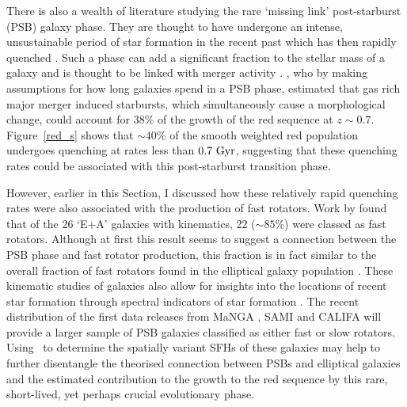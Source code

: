 There is also a wealth of literature studying the rare \citep[$<1\%$;][]{Wong12, wild16} `missing link' post-starburst (PSB) galaxy phase. They are thought to have undergone an intense, unsustainable period of star formation in the recent past which has then rapidly quenched \citep{dressler83, abraham96b, poggianti99, goto03, goto05b, goto07}. Such a phase can add a significant fraction \citep[$\sim10\%$;][]{wild10} to the stellar mass of a galaxy and is thought to be linked with merger activity \citep{zabludoff96, blake04, goto05b, yang08, pawlik16}. \citet{Wild09}, who by making assumptions for how long galaxies spend in a PSB phase, estimated that gas rich major merger induced starbursts, which simultaneously cause a morphological change, could account for $38\%$ of the growth of the red sequence at $z\sim0.7$. Figure~\ref{red_s} shows that $\sim40\%$ of the smooth weighted red population undergoes quenching at rates less than $0.7~\rm{Gyr}$, suggesting that these quenching rates could be associated with this post-starburst transition phase. 

However, earlier in this Section, I discussed how these relatively rapid quenching rates were also associated with the production of fast rotators. Work by \citep{pracy13} found that of the 26 `E+A' galaxies with kinematics, 22 ($\sim85\%$) were classed as fast rotators. Although at first this result seems to suggest a connection between the PSB phase and fast rotator production, this fraction is in fact similar to the overall fraction of fast rotators found in the elliptical galaxy population \citep{emsellem11, stott16}. These kinematic studies of galaxies also allow for insights into the locations of recent star formation through spectral indicators of star formation \citep[such as $H\alpha$][]{kennicutt94}. The recent distribution of the first data releases from MaNGA \citep{ref}, SAMI \citep{ref} and CALIFA \citep{ref} will provide a larger sample of PSB galaxies classified as either fast or slow rotators. Using \starpy\ to determine the spatially variant SFHs of these galaxies may help to further disentangle the theorised connection between PSBs and elliptical galaxies and the estimated contribution to the growth to the red sequence by this rare, short-lived, yet perhaps crucial evolutionary phase. 

